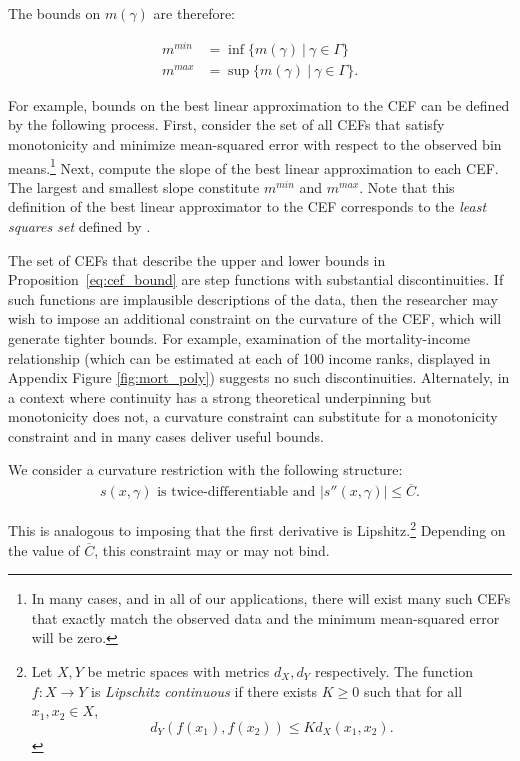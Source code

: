 The bounds on $m(\gamma)$ are therefore:

\begin{equation}
  \begin{aligned}
    \label{eq:m_bounds}
    m^{min} &= \inf\{m(\gamma) \ \vert \ \gamma \in \Gamma \} \\ m^{max} &= \sup\{m(\gamma) \ \vert \ \gamma \in \Gamma \}.
  \end{aligned}
\end{equation}

For example, bounds on the best linear approximation to the CEF can be defined by the following process. First, consider the set of all CEFs that satisfy monotonicity and minimize mean-squared error with respect to the observed bin means.\footnote{In many cases, and in all of our applications, there will exist many such CEFs that exactly match the observed data and the minimum mean-squared error will be zero.} Next, compute the slope of the best linear approximation to each CEF. The largest and smallest slope constitute $m^{min}$ and $m^{max}$. Note that this definition of the best linear approximator to the CEF corresponds to the \textit{least squares set} defined by \citet{Ponomareva2011}.

The set of CEFs that describe the upper and lower bounds in Proposition~\ref{eq:cef_bound} are step functions with substantial discontinuities. If such functions are implausible descriptions of the data, then the researcher may wish to impose an additional constraint on the curvature of the CEF, which will generate tighter bounds. For example, examination of the mortality-income relationship (which can be estimated at each of 100 income ranks, displayed in Appendix Figure \ref{fig:mort_poly}) suggests no such discontinuities. Alternately, in a context where continuity has a strong theoretical underpinning but monotonicity does not, a curvature constraint can substitute for a monotonicity constraint and in many cases deliver useful bounds.

We consider a curvature restriction with the following structure:
\begin{align}
  \label{eq:c_bar}
  \tag{Curvature Constraint} \tag{Or alt Curvature} s(x,\gamma) \text{ is twice-differentiable and } \vert s''(x,\gamma) \vert \leq \overline{C}.
\end{align}

\noindent This is analogous to imposing that the first derivative is Lipshitz.\footnote{Let $X, Y$ be metric spaces with metrics $d_X, d_Y$ respectively. The function $f:X \to Y$ is \textit{Lipschitz continuous} if there exists $K \geq 0$ such that for all $x_1,x_2 \in X$,
  $$d_Y(f(x_1),f(x_2)) \leq K d_X(x_1,x_2).$$} Depending on the value
of $\overline{C}$, this constraint may or may not bind. 

